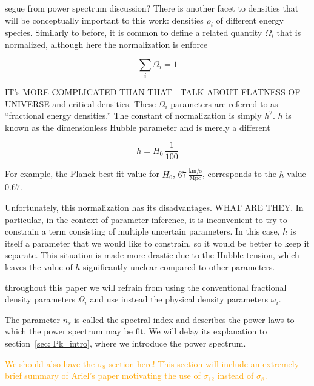 {segue from power spectrum discussion?} There is another facet to densities that will be conceptually important to this work: densities $\rho_i$ of different energy species. Similarly to before, it is common to define a related quantity $\Omega_i$ that is normalized, although here the normalization is enforce

\begin{equation}
\sum_i \Omega_i = 1
\end{equation}

IT’s MORE COMPLICATED THAN THAT—TALK ABOUT FLATNESS OF UNIVERSE and critical densities. These $\Omega_i$ parameters are referred to as “fractional energy densities.” The constant of normalization is simply $h^2$. $h$ is known as
the dimensionless Hubble parameter and is merely a different 

\begin{equation}
h = H_0 \, \frac{1}{100 }
\end{equation}

For example, the Planck best-fit value for $H_0$,
$67 \, \frac{\mathrm{km} / \mathrm{s}}{\mathrm{Mpc}}$,
corresponds to the $h$ value $0.67$. 

Unfortunately, this normalization has its disadvantages. WHAT ARE THEY. In particular, in the context of parameter inference, it is inconvenient to try to constrain a term consisting of multiple uncertain parameters. In this case, $h$ is itself a parameter that we would like to constrain, so it would be better to keep it separate. This situation is made more drastic due to the Hubble tension, which leaves the value of $h$ significantly unclear compared to other parameters.

throughout this paper we will refrain from using the conventional
fractional density parameters $\Omega_i$ and use instead the physical density
parameters $\omega_i$.

The parameter $n_s$ is called the spectral index and describes the power laws
to which the power spectrum may be fit. We will delay its explanation to
section~\ref{sec: Pk_intro}, where we introduce the power spectrum.


\textcolor{orange}{We should also have the $\sigma_8$ section here! This 
section will include an extremely brief summary of Ariel's paper motivating 
the use of $\sigma_{12}$ instead of $\sigma_8$.}

